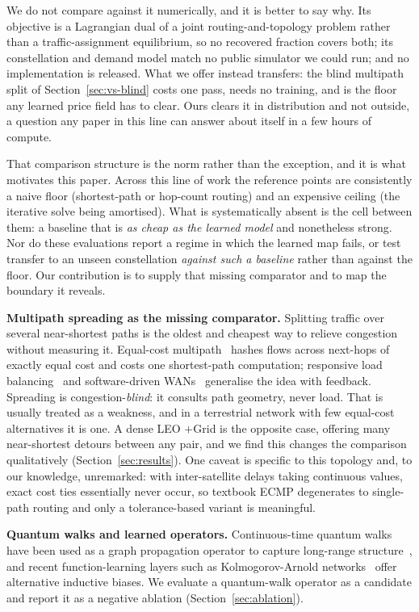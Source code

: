 \documentclass[journal]{IEEEtran}
\begin{document}
We do not compare against it numerically, and it is better to say why. Its objective is a
Lagrangian dual of a joint routing-and-topology problem rather than a traffic-assignment
equilibrium, so no recovered fraction covers both; its constellation and demand model match no
public simulator we could run; and no implementation is released. What we offer instead transfers:
the blind multipath split of Section~\ref{sec:vs-blind} costs one pass, needs no training, and is
the floor any learned price field has to clear. Ours clears it in distribution and not outside, a
question any paper in this line can answer about itself in a few hours of compute.

That comparison structure is the norm rather than the exception, and it is what motivates this
paper. Across this line of work the reference points are consistently a naive floor
(shortest-path or hop-count routing) and an expensive ceiling (the iterative solve being
amortised). What is systematically absent is the cell between them: a baseline that is
\emph{as cheap as the learned model} and nonetheless strong. Nor do these evaluations report a
regime in which the learned map fails, or test transfer to an unseen constellation
\emph{against such a baseline} rather than against the floor. Our contribution is to supply
that missing comparator and to map the boundary it reveals.

\textbf{Multipath spreading as the missing comparator.} Splitting traffic over several
near-shortest paths is the oldest and cheapest way to relieve congestion without measuring it.
Equal-cost multipath~\cite{ecmp} hashes flows across next-hops of exactly equal cost and costs
one shortest-path computation; responsive load balancing~\cite{texcp} and software-driven
WANs~\cite{swan,b4} generalise the idea with feedback. Spreading is congestion-\emph{blind}: it
consults path geometry, never load. That is usually treated as a weakness, and in a
terrestrial network with few equal-cost alternatives it is one. A dense LEO $+$Grid is the
opposite case, offering many near-shortest detours between any pair, and we find this changes
the comparison qualitatively (Section~\ref{sec:results}). One caveat is specific to this
topology and, to our knowledge, unremarked: with inter-satellite delays taking continuous
values, exact cost ties essentially never occur, so textbook ECMP degenerates to single-path
routing and only a tolerance-based variant is meaningful.

\textbf{Quantum walks and learned operators.} Continuous-time quantum walks have been used
as a graph propagation operator to capture long-range structure~\cite{qwnn}, and recent
function-learning layers such as Kolmogorov-Arnold networks~\cite{kan} offer alternative
inductive biases. We evaluate a quantum-walk operator as a candidate and report it as a
negative ablation (Section~\ref{sec:ablation}).
\end{document}
